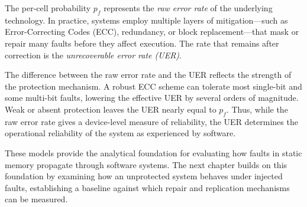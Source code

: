 The per-cell probability $p_f$ represents the \textit{raw error rate} of the underlying technology. 
In practice, systems employ multiple layers of mitigation—such as Error-Correcting Codes (ECC), redundancy, or block replacement—that mask or repair many faults before they affect execution. 
The rate that remains after correction is the \textit{unrecoverable error rate (UER)}.

The difference between the raw error rate and the UER reflects the strength of the protection mechanism. 
A robust ECC scheme can tolerate most single-bit and some multi-bit faults, lowering the effective UER by several orders of magnitude. 
Weak or absent protection leaves the UER nearly equal to $p_f$. 
Thus, while the raw error rate gives a device-level measure of reliability, the UER determines the operational reliability of the system as experienced by software.

These models provide the analytical foundation for evaluating how faults in static memory propagate through software systems. 
The next chapter builds on this foundation by examining how an unprotected system behaves under injected faults, establishing a baseline against which repair and replication mechanisms can be measured.